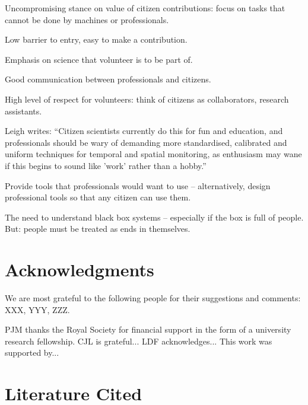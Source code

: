 \documentclass{ar2e}
\begin{document}
Uncompromising stance on value of citizen contributions: focus on tasks that
cannot be done by machines or professionals.

Low barrier to entry, easy to make a contribution.

Emphasis on science that volunteer is to be part of. 

Good communication between professionals and citizens.

High level of respect for volunteers: think of citizens as collaborators,
research assistants.

Leigh writes: ``Citizen
scientists currently do this for fun and education, and professionals should
be wary of demanding more standardised, calibrated and uniform techniques for
temporal and spatial monitoring, as enthusiasm may wane if this begins to
sound like 'work' rather than a hobby.''

Provide tools that professionals would want to use -- alternatively, design
professional tools so that any citizen can use them.

The need to understand black box systems -- especially if the box is full of
people. But: people must be treated as ends in themselves. 


\section*{Acknowledgments}

We are most grateful to the following people for their suggestions and comments:
XXX, YYY, ZZZ. 

PJM thanks the Royal Society for financial support in the form of a university
research fellowship. 
%
CJL is grateful...
%
LDF acknowledges...
% 
This work was supported by...


\section{Literature Cited}





\end{document}
